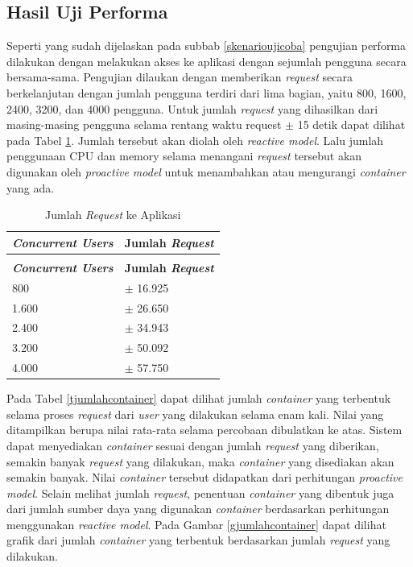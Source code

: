 \subsection{Hasil Uji Performa}
Seperti yang sudah dijelaskan pada subbab \ref{skenarioujicoba} pengujian performa dilakukan dengan melakukan akses ke aplikasi dengan sejumlah pengguna secara bersama-sama. Pengujian dilaukan dengan memberikan \textit{request} secara berkelanjutan dengan jumlah pengguna terdiri dari lima bagian, yaitu 800, 1600, 2400, 3200, dan 4000 pengguna. Untuk jumlah \textit{request} yang dihasilkan dari masing-masing pengguna selama rentang waktu request $\pm$ 15 detik dapat dilihat pada Tabel \ref{trequest}. Jumlah tersebut akan diolah oleh \textit{reactive model}. Lalu jumlah penggunaan CPU dan memory selama menangani \textit{request} tersebut akan digunakan oleh \textit{proactive model} untuk menambahkan atau mengurangi \textit{container} yang ada.
\begin{longtable}{|p{}|p{}|}
	\caption{Jumlah \textit{Request} ke Aplikasi} \label{trequest} \\
	\hline
	\textbf{\textit{Concurrent Users}} & \textbf{Jumlah \textit{Request}} \\ \hline
	\endfirsthead
	\caption[]{Jumlah \textit{Request} ke Aplikasi} \\
	\hline
	\textbf{\textit{Concurrent Users}} & \textbf{Jumlah \textit{Request}} \\ \hline
	\endhead
	\endfoot
	\endlastfoot
	
	800 & $\pm$ 16.925 \\ \hline
	1.600 & $\pm$ 26.650 \\ \hline
	2.400 & $\pm$ 34.943 \\ \hline
	3.200 & $\pm$ 50.092 \\ \hline
	4.000 & $\pm$ 57.750 \\ \hline
	
\end{longtable}

Pada Tabel \ref{tjumlahcontainer} dapat dilihat jumlah \textit{container} yang terbentuk selama proses \textit{request} dari \textit{user} yang dilakukan selama enam kali. Nilai yang ditampilkan berupa nilai rata-rata selama percobaan dibulatkan ke atas. Sistem dapat menyediakan \textit{container} sesuai dengan jumlah \textit{request} yang diberikan, semakin banyak \textit{request} yang dilakukan, maka \textit{container} yang disediakan akan semakin banyak. Nilai \textit{container} tersebut didapatkan dari perhitungan \textit{proactive model}. Selain melihat jumlah \textit{request}, penentuan \textit{container} yang dibentuk juga dari jumlah sumber daya yang digunakan \textit{container} berdasarkan perhitungan menggunakan \textit{reactive model}. Pada Gambar \ref{gjumlahcontainer} dapat dilihat grafik dari jumlah \textit{container} yang terbentuk berdasarkan jumlah \textit{request} yang dilakukan.

